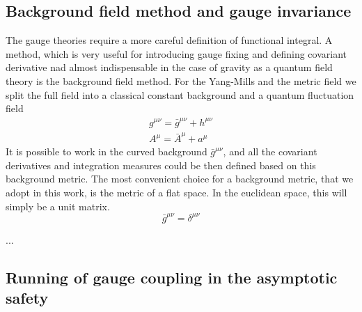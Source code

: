 \documentclass[11pt, a4paper]{article}
\begin{document}
\subsection{Background field method and gauge invariance}
The gauge theories require a more careful definition of functional integral.
A method, which is very useful for
introducing gauge fixing and defining covariant derivative nad almost indispensable in the case of
gravity as a quantum field theory is the background field method.
For the Yang-Mills and the metric field we split the full field into a classical constant background
and a quantum fluctuation field
\begin{align}
    g^{\mu\nu} = \bar{g}^{\mu\nu} + h^{\mu\nu}\\
    A^{\mu} = \bar{A}^\mu + a^\mu
\end{align}
It is possible to work in the curved background $\bar{g}^{\mu\nu}$, and all the covariant derivatives and
integration measures could be then defined based on this background metric.
The most convenient choice for a background metric, that we adopt in this work, is the metric of a flat space.
In the euclidean space, this will simply be a unit matrix.
\begin{equation}
    \bar{g}^{\mu\nu} = \delta^{\mu\nu}
\end{equation}


...



\subsection{Running of gauge coupling in the asymptotic safety}
\end{document}
